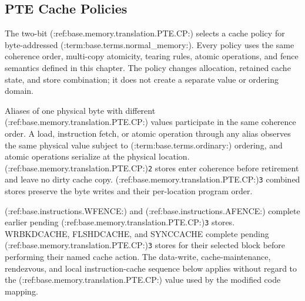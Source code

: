 \subsection{PTE Cache Policies}
The two-bit (:ref:base.memory.translation.PTE.CP:) selects a cache policy for byte-addressed (:term:base.terms.normal_memory:). Every policy uses the
same coherence order, multi-copy atomicity, tearing rules, atomic operations, and fence semantics defined in this
chapter. The policy changes allocation, retained cache state, and store combination; it does not create a separate
value or ordering domain.



Aliases of one physical byte with different (:ref:base.memory.translation.PTE.CP:) values participate in the same coherence order. A load,
instruction fetch, or atomic operation through any alias observes the same physical value subject to (:term:base.terms.ordinary:)
ordering, and atomic operations serialize at the physical location. (:ref:base.memory.translation.PTE.CP:)\texttt{2} stores enter coherence before retirement
and leave no dirty cache copy. (:ref:base.memory.translation.PTE.CP:)\texttt{3} combined stores preserve the byte writes and their per-location program order.

(:ref:base.instructions.WFENCE:) and (:ref:base.instructions.AFENCE:) complete earlier pending (:ref:base.memory.translation.PTE.CP:)\texttt{3} stores. WRBKDCACHE, FLSHDCACHE, and SYNCCACHE
complete pending (:ref:base.memory.translation.PTE.CP:)\texttt{3} stores for their selected block before performing their named cache action. The
data-write, cache-maintenance, rendezvous, and local instruction-cache sequence below applies without regard to the
(:ref:base.memory.translation.PTE.CP:) value used by the modified code mapping.
